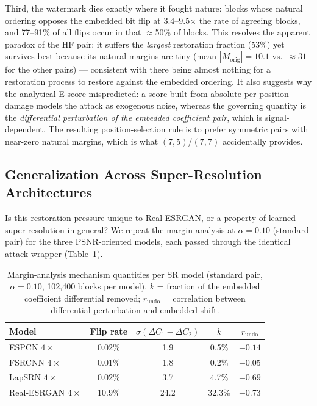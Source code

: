 \documentclass[conference]{IEEEtran}
\begin{document}
Third, the watermark dies exactly where it fought nature: blocks whose
natural ordering opposes the embedded bit flip at 3.4--9.5$\times$ the
rate of agreeing blocks, and 77--91\% of all flips occur in that
$\approx$50\% of blocks. This resolves the apparent paradox of the HF
pair: it suffers the \emph{largest} restoration fraction (53\%) yet
survives best because its natural margins are tiny (mean
$|M_{\mathrm{orig}}| = 10.1$ vs.\ $\approx 31$ for the other pairs) ---
consistent with there being almost nothing for a restoration process to
restore against the embedded ordering. It also suggests why the
analytical E-score mispredicted: a score built from absolute
per-position damage models the attack as exogenous noise, whereas the
governing quantity is the \emph{differential perturbation of the
embedded coefficient pair}, which is signal-dependent. The resulting
position-selection rule is to prefer symmetric pairs with near-zero
natural margins, which is what $(7,5)/(7,7)$ accidentally provides.

\subsection{Generalization Across Super-Resolution Architectures}
\label{sec:generalization}

Is this restoration pressure unique to Real-ESRGAN, or a property of
learned super-resolution in general? We repeat the margin analysis at
$\alpha = 0.10$ (standard pair) for the three PSNR-oriented models,
each passed through the identical attack wrapper
(Table~\ref{tab:mechanism}).

\begin{table}[t]
\caption{Margin-analysis mechanism quantities per SR model (standard
pair, $\alpha=0.10$, 102,400 blocks per model). $k$ = fraction of the
embedded coefficient differential removed; $r_{\mathrm{undo}}$ =
correlation between differential perturbation and embedded shift.}
\label{tab:mechanism}
\centering
\begin{tabular}{lcccc}
\toprule
Model & Flip rate & $\sigma(\Delta C_1{-}\Delta C_2)$ & $k$ & $r_{\mathrm{undo}}$ \\
\midrule
ESPCN $4\times$       & 0.02\% & 1.9  & 0.5\%  & $-0.14$ \\
FSRCNN $4\times$      & 0.01\% & 1.8  & 0.2\%  & $-0.05$ \\
LapSRN $4\times$      & 0.02\% & 3.7  & 4.7\%  & $-0.69$ \\
Real-ESRGAN $4\times$ & 10.9\% & 24.2 & 32.3\% & $-0.73$ \\
\bottomrule
\end{tabular}
\end{table}
\end{document}
